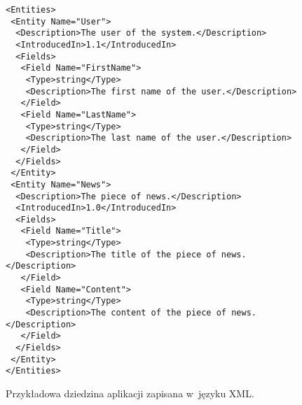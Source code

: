 \begin{figure}[!ht]
\begin{verbatim}
<Entities>
 <Entity Name="User">
  <Description>The user of the system.</Description>
  <IntroducedIn>1.1</IntroducedIn>
  <Fields>
   <Field Name="FirstName">
    <Type>string</Type>
    <Description>The first name of the user.</Description>
   </Field>
   <Field Name="LastName">
    <Type>string</Type>
    <Description>The last name of the user.</Description>
   </Field>
  </Fields>
 </Entity>
 <Entity Name="News">
  <Description>The piece of news.</Description>
  <IntroducedIn>1.0</IntroducedIn>
  <Fields>
   <Field Name="Title">
    <Type>string</Type>
    <Description>The title of the piece of news.</Description>
   </Field>
   <Field Name="Content">
    <Type>string</Type>
    <Description>The content of the piece of news.</Description>
   </Field>
  </Fields>
 </Entity>
</Entities>
\end{verbatim}

\caption{Przykładowa dziedzina aplikacji zapisana w~języku XML.}
\label{fig:implementation_core:xml}
\end{figure}
